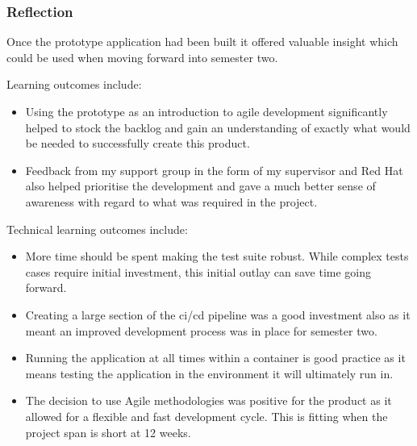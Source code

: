 \subsubsection{Reflection}
Once the prototype application had been built it offered valuable insight which could be used when moving forward into semester two.

Learning outcomes include:
\begin{itemize}
	\item Using the prototype as an introduction to agile development significantly helped to stock the \gls{backlog} and gain an understanding of exactly what would be needed to successfully create this product.
	\item Feedback from my support group in the form of my supervisor and Red Hat also helped prioritise the development and gave a much better sense of awareness with regard to what was required in the project.
\end{itemize}

Technical learning outcomes include:
\begin{itemize}
	\item More time should be spent making the test suite robust. While complex tests cases require initial investment, this initial outlay can save time going forward.
	\item Creating a large section of the \gls{ci/cd} pipeline was a good investment also as it meant an improved development process was in place for semester two.
	\item Running the application at all times within a container is good practice as it means testing the application in the environment it will ultimately run in.
	\item The decision to use Agile methodologies was positive for the product as it allowed for a flexible and fast development cycle. This is fitting when the project span is short at 12 weeks.
\end{itemize}
